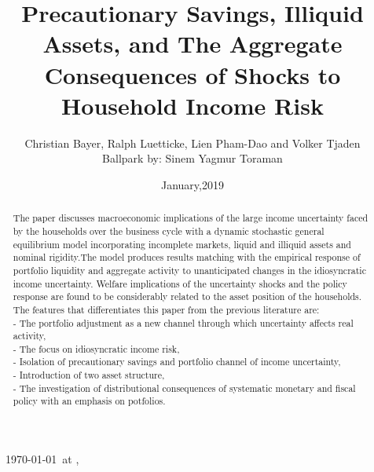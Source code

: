 \documentclass[titlepage]{\econtex}
\begin{document}
\providecommand{\versn}{}
\ifthenelse{\boolean{ifWeb}}{  \renewcommand{\ushort}{\underline}\renewcommand{\versn}{Web} }{} 

\hfill{\tiny \jobname~\versn~\today~{at} \DTMcurrenttime, ~~}

\title{Precautionary Savings, Illiquid Assets, and The Aggregate Consequences of Shocks to Household Income Risk}

\author{Christian Bayer, Ralph Luetticke, Lien Pham-Dao and Volker Tjaden \\ Ballpark by: Sinem Yagmur Toraman\authNum}



\renewcommand{\forcedate}{January,2019}
\date{\forcedate}

\maketitle 
\hypertarget{abstract}{}
\begin{abstract}
  The paper discusses macroeconomic implications of the large income uncertainty faced by the households over the business cycle with a dynamic stochastic general equilibrium model incorporating incomplete markets, liquid and illiquid assets and nominal rigidity.The model produces results matching with the empirical response of portfolio liquidity and aggregate activity to unanticipated changes in the idiosyncratic income uncertainty. Welfare implications of the uncertainty shocks and the policy response are found to be considerably related to the asset position of the households.\\
  The features that differentiates this paper from the previous literature are:\\
 -  The portfolio adjustment as a new channel through which uncertainty affects real activity,\\
 -  The focus on idiosyncratic income risk,\\
 -  Isolation of precautionary savings and portfolio channel of income uncertainty,\\
 -  Introduction of two asset structure,\\
 -  The investigation of distributional consequences of systematic monetary and fiscal policy with an emphasis on potfolios.
\end{abstract}
\end{document}
